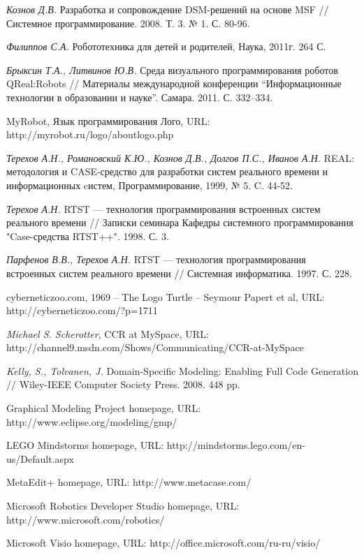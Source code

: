 \documentclass[a4paper]{article}
\begin{document}
\begin{thebibliography}{9001}
   \emph{Кознов Д.В.} Разработка и сопровождение DSM-решений на основе MSF // Системное программирование. 2008. Т. 3. № 1. С. 80-96.

   \emph{Филиппов С.А.} Робототехника для детей и родителей, Наука, 2011г. 264 С.

   \emph{Брыксин Т.А., Литвинов Ю.В.} Среда визуального программирования роботов QReal:Robots // Материалы международной конференции ``Информационные технологии в образовании и науке''. Самара. 2011. С. 332--334.

   MyRobot, Язык программирования Лого, URL: http://myrobot.ru/logo/aboutlogo.php   

   \emph{Терехов А.Н., Романовский К.Ю., Кознов Д.В., Долгов П.С., Иванов А.Н.} REAL: методология и CASE-средство для разработки систем реального времени и информационных cистем, Программирование, 1999, № 5. C. 44-52.

   \emph{Терехов А.Н.} RTST --- технология программирования встроенных систем реального времени // Записки семинара Кафедры системного программирования "Case-средства RTST++". 1998. С. 3.

   \emph{Парфенов В.В., Терехов А.Н.} RTST --- технология программирования встроенных систем реального времени // Системная информатика. 1997. С. 228.

   cyberneticzoo.com, 1969 – The Logo Turtle – Seymour Papert et al, URL: http://cyberneticzoo.com/?p=1711 

   \emph{Michael S. Scherotter}, CCR at MySpace, URL: http://channel9.msdn.com/Shows/Communicating/CCR-at-MySpace 

   \emph{Kelly, S., Tolvanen, J.} Domain-Specific Modeling: Enabling Full Code Generation // Wiley-IEEE Computer Society Press. 2008. 448 pp.

   Graphical Modeling Project homepage, URL: http://www.eclipse.org/modeling/gmp/ 

   LEGO Mindstorms homepage, URL: http://mindstorms.lego.com/en-us/Default.aspx

   MetaEdit+ homepage, URL: http://www.metacase.com/ 

   Microsoft Robotics Developer Studio homepage, URL: http://www.microsoft.com/robotics/ 

   Microsoft Visio homepage, URL: http://office.microsoft.com/ru-ru/visio/


\end{thebibliography}
\end{document}
